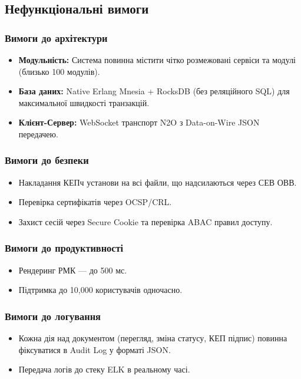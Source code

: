 \documentclass{article}
\begin{document}
\subsection{Нефункціональні вимоги}

\subsubsection{Вимоги до архітектури}
\begin{itemize}
    \item \textbf{Модульність:} Система повинна містити чітко розмежовані сервіси та модулі (близько 100 модулів).
    \item \textbf{База даних:} Native Erlang Mnesia + RocksDB (без реляційного SQL) для максимальної швидкості транзакцій.
    \item \textbf{Клієнт-Сервер:} WebSocket транспорт N2O з Data-on-Wire JSON передачею.
\end{itemize}

\subsubsection{Вимоги до безпеки}
\begin{itemize}
    \item Накладання КЕПч установи на всі файли, що надсилаються через СЕВ ОВВ.
    \item Перевірка сертифікатів через OCSP/CRL.
    \item Захист сесій через Secure Cookie та перевірка ABAC правил доступу.
\end{itemize}

\subsubsection{Вимоги до продуктивності}
\begin{itemize}
    \item Рендеринг РМК --- до 500 мс.
    \item Підтримка до 10,000 користувачів одночасно.
\end{itemize}

\subsubsection{Вимоги до логування}
\begin{itemize}
    \item Кожна дія над документом (перегляд, зміна статусу, КЕП підпис) повинна фіксуватися в Audit Log у форматі JSON.
    \item Передача логів до стеку ELK в реальному часі.
\end{itemize}
\end{document}
